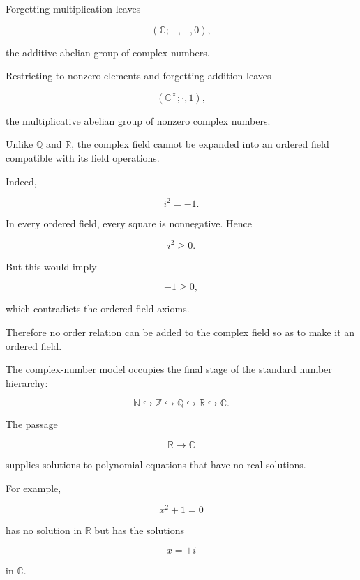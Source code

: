 \begin{remark*}

Forgetting multiplication leaves

\[
(\mathbb C;+,-,0),
\]

the additive abelian group of complex numbers.

\end{remark*}

\begin{remark*}

Restricting to nonzero elements and forgetting addition leaves

\[
(\mathbb C^\times;\cdot,1),
\]

the multiplicative abelian group of nonzero complex numbers.

\end{remark*}


\begin{remark*}

Unlike $\mathbb Q$ and $\mathbb R$, the complex field cannot be expanded into
an ordered field compatible with its field operations.

Indeed,

\[
i^2=-1.
\]

In every ordered field, every square is nonnegative. Hence

\[
i^2 \ge 0.
\]

But this would imply

\[
-1 \ge 0,
\]

which contradicts the ordered-field axioms.

Therefore no order relation can be added to the complex field so as to make it
an ordered field.

\end{remark*}


\begin{remark*}

The complex-number model occupies the final stage of the standard number
hierarchy:

\[
\mathbb N
\hookrightarrow
\mathbb Z
\hookrightarrow
\mathbb Q
\hookrightarrow
\mathbb R
\hookrightarrow
\mathbb C.
\]

The passage

\[
\mathbb R
\longrightarrow
\mathbb C
\]

supplies solutions to polynomial equations that have no real solutions.

For example,

\[
x^2+1=0
\]

has no solution in $\mathbb R$ but has the solutions

\[
x=\pm i
\]

in $\mathbb C$.

\end{remark*}

